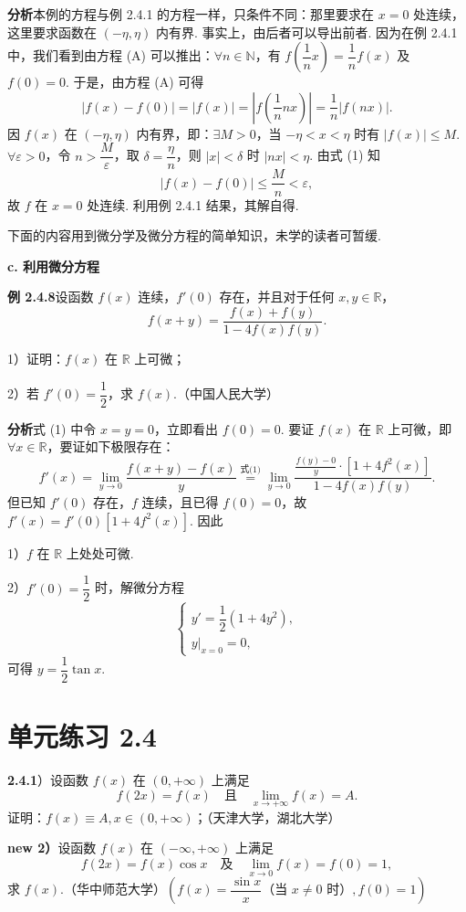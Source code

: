 \documentclass[UTF8,12pt,a4paper,fontset=fandol]{ctexart}
\begin{document}
\noindent\textbf{分析}\quad 本例的方程与例 2.4.1 的方程一样，只条件不同：那里要求在 $x=0$ 处连续，这里要求函数在 $(-\eta,\eta)$ 内有界. 事实上，由后者可以导出前者. 因为在例 2.4.1 中，我们看到由方程 (A) 可以推出：$\forall n\in\mathbb{N}$，有 $f\left(\dfrac1nx\right)=\dfrac1nf(x)$ 及 $f(0)=0$. 于是，由方程 (A) 可得
\[
  |f(x)-f(0)|=|f(x)|=\left|f\left(\frac1nnx\right)\right|=\frac1n|f(nx)|. \tag{1}
\]
因 $f(x)$ 在 $(-\eta,\eta)$ 内有界，即：$\exists M>0$，当 $-\eta<x<\eta$ 时有 $|f(x)|\le M$. $\forall\varepsilon>0$，令 $n>\dfrac M\varepsilon$，取 $\delta=\dfrac\eta n$，则 $|x|<\delta$ 时 $|nx|<\eta$. 由式 (1) 知
\[
  |f(x)-f(0)|\le\frac Mn<\varepsilon,
\]
故 $f$ 在 $x=0$ 处连续. 利用例 2.4.1 结果，其解自得.

下面的内容用到微分学及微分方程的简单知识，未学的读者可暂缓.

\noindent\textbf{c. 利用微分方程}

\noindent\textbf{例 2.4.8}\quad 设函数 $f(x)$ 连续，$f'(0)$ 存在，并且对于任何 $x,y\in\mathbb{R}$，
\[
  f(x+y)=\frac{f(x)+f(y)}{1-4f(x)f(y)}. \tag{1}
\]

1）证明：$f(x)$ 在 $\mathbb{R}$ 上可微；

2）若 $f'(0)=\dfrac12$，求 $f(x)$.（中国人民大学）

\noindent\textbf{分析}\quad 式 (1) 中令 $x=y=0$，立即看出 $f(0)=0$. 要证 $f(x)$ 在 $\mathbb{R}$ 上可微，即 $\forall x\in\mathbb{R}$，要证如下极限存在：
\[
  f'(x)=\lim_{y\to0}\frac{f(x+y)-f(x)}{y}
  \overset{\text{式(1)}}{=}\lim_{y\to0}\frac{\frac{f(y)-0}{y}\cdot[1+4f^2(x)]}{1-4f(x)f(y)}.
\]
但已知 $f'(0)$ 存在，$f$ 连续，且已得 $f(0)=0$，故 $f'(x)=f'(0)[1+4f^2(x)]$. 因此

1）$f$ 在 $\mathbb{R}$ 上处处可微.

2）$f'(0)=\dfrac12$ 时，解微分方程
\[
  \begin{cases}
    y'=\dfrac12(1+4y^2),\\
    y|_{x=0}=0,
  \end{cases}
\]
可得 $y=\dfrac12\tan x$.

\section*{单元练习 2.4}

\noindent\textbf{2.4.1}）设函数 $f(x)$ 在 $(0,+\infty)$ 上满足
\[
  f(2x)=f(x)\quad\text{且}\quad \lim_{x\to+\infty}f(x)=A.
\]
证明：$f(x)\equiv A,x\in(0,+\infty)$；（天津大学，湖北大学）

\noindent\textbf{new 2）}\quad 设函数 $f(x)$ 在 $(-\infty,+\infty)$ 上满足
\[
  f(2x)=f(x)\cos x\quad\text{及}\quad \lim_{x\to0}f(x)=f(0)=1,
\]
求 $f(x)$.（华中师范大学）\hfill$\left(f(x)=\dfrac{\sin x}{x}\text{（当 }x\ne0\text{ 时）},f(0)=1\right)$
\end{document}
